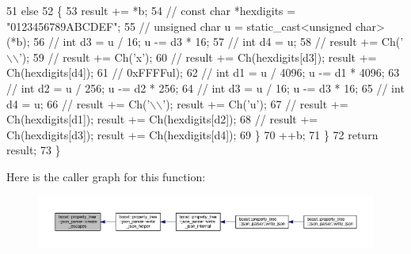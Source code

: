 \begin{DoxyCode}
51     \textcolor{keywordflow}{else}
52     \{
53       result += *b;
54       \textcolor{comment}{// const char *hexdigits = "0123456789ABCDEF";}
55       \textcolor{comment}{// unsigned char u = static\_cast<unsigned char>(*b);}
56       \textcolor{comment}{// int d3 = u / 16; u -= d3 * 16;}
57       \textcolor{comment}{// int d4 = u;}
58       \textcolor{comment}{// result += Ch('\(\backslash\)\(\backslash\)');}
59       \textcolor{comment}{// result += Ch('x');}
60       \textcolor{comment}{// result += Ch(hexdigits[d3]); result += Ch(hexdigits[d4]);}
61       \textcolor{comment}{//                              0xFFFFul);}
62       \textcolor{comment}{// int d1 = u / 4096; u -= d1 * 4096;}
63       \textcolor{comment}{// int d2 = u / 256; u -= d2 * 256;}
64       \textcolor{comment}{// int d3 = u / 16; u -= d3 * 16;}
65       \textcolor{comment}{// int d4 = u;}
66       \textcolor{comment}{// result += Ch('\(\backslash\)\(\backslash\)'); result += Ch('u');}
67       \textcolor{comment}{// result += Ch(hexdigits[d1]); result += Ch(hexdigits[d2]);}
68       \textcolor{comment}{// result += Ch(hexdigits[d3]); result += Ch(hexdigits[d4]);}
69     \}
70     ++b;
71   \}
72   \textcolor{keywordflow}{return} result;
73 \}
\end{DoxyCode}


Here is the caller graph for this function\+:
\nopagebreak
\begin{figure}[H]
\begin{center}
\leavevmode
\includegraphics[width=350pt]{namespaceboost_1_1property__tree_1_1json__parser_a747e92e137769eb6b27edb76d613f37a_icgraph}
\end{center}
\end{figure}


